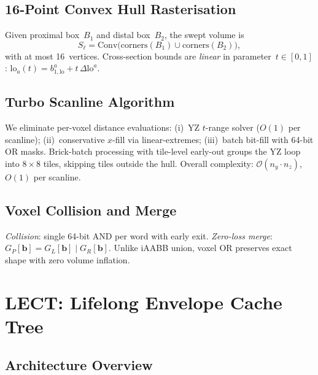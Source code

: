 \documentclass[journal]{IEEEtran}
\newcommand{\calO}{\mathcal{O}}
\begin{document}
\subsection{16-Point Convex Hull Rasterisation}\label{sec:hull16}

Given proximal box~$B_1$ and distal box~$B_2$, the swept volume is
\begin{equation}\label{eq:hull16}
  S_\ell = \mathrm{Conv}\bigl(\mathrm{corners}(B_1)
  \cup \mathrm{corners}(B_2)\bigr),
\end{equation}
with at most 16~vertices.
Cross-section bounds are \emph{linear} in parameter~$t \in [0,1]$:
$\mathrm{lo}_a(t) = b_{1,\mathrm{lo}}^a + t\,\Delta\mathrm{lo}^a$.

\subsection{Turbo Scanline Algorithm}\label{sec:turbo}

We eliminate per-voxel distance evaluations:
(i)~YZ $t$-range solver ($O(1)$ per scanline);
(ii)~conservative $x$-fill via linear-extremes;
(iii)~batch bit-fill with 64-bit OR masks.
Brick-batch processing with tile-level early-out groups the YZ loop
into $8\times 8$ tiles, skipping tiles outside the hull.
Overall complexity: $\calO(n_y \cdot n_z)$, $O(1)$ per scanline.

\subsection{Voxel Collision and Merge}\label{sec:voxel_ops}

\emph{Collision}: single 64-bit AND per word with early exit.
\emph{Zero-loss merge}: $G_P[\bm{b}] = G_L[\bm{b}] \mathbin{|} G_R[\bm{b}]$.
Unlike iAABB union, voxel OR preserves exact shape with zero volume
inflation.

\section{LECT: Lifelong Envelope Cache Tree}\label{sec:lect}

\subsection{Architecture Overview}
\end{document}

